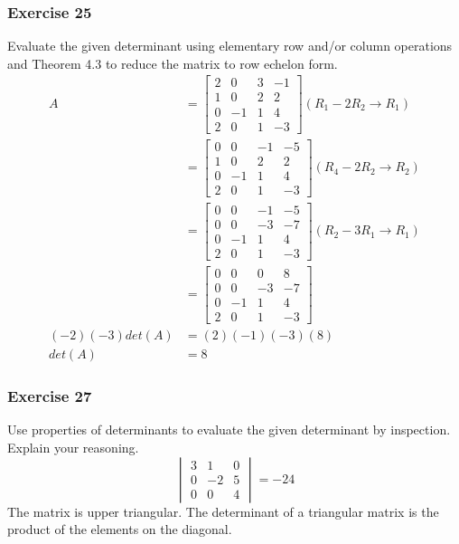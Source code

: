 \documentclass{math}
\begin{document}
\subsubsection*{Exercise 25}
Evaluate the given determinant using elementary row and/or column operations and
Theorem 4.3 to reduce the matrix to row echelon form.
\begin{align*}
  A &= \begin{bmatrix}
    2 & 0 & 3 & -1 \\
    1 & 0 & 2 & 2 \\
    0 & -1 & 1 & 4 \\
    2 & 0 & 1 & -3
  \end{bmatrix} (R_1-2R_2\to R_1) \\
  &= \begin{bmatrix}
    0 & 0 & -1 & -5 \\
    1 & 0 & 2 & 2 \\
    0 & -1 & 1 & 4 \\
    2 & 0 & 1 & -3
  \end{bmatrix} (R_4-2R_2\to R_2) \\
  &= \begin{bmatrix}
    0 & 0 & -1 & -5 \\
    0 & 0 & -3 & -7 \\
    0 & -1 & 1 & 4 \\
    2 & 0 & 1 & -3
  \end{bmatrix} (R_2-3R_1\to R_1) \\
  &= \begin{bmatrix}
    0 & 0 & 0 & 8 \\
    0 & 0 & -3 & -7 \\
    0 & -1 & 1 & 4 \\
    2 & 0 & 1 & -3
  \end{bmatrix} \\
  (-2)(-3)det(A) &= (2)(-1)(-3)(8) \\
  det(A) &= 8
\end{align*}

\subsubsection*{Exercise 27}
Use properties of determinants to evaluate the given determinant by inspection.
Explain your reasoning.
\[ \begin{vmatrix}
  3 & 1 & 0 \\
  0 & -2 & 5 \\
  0 & 0 & 4
\end{vmatrix} = -24 \]
The matrix is upper triangular. The determinant of a triangular matrix is the
product of the elements on the diagonal.
\end{document}

